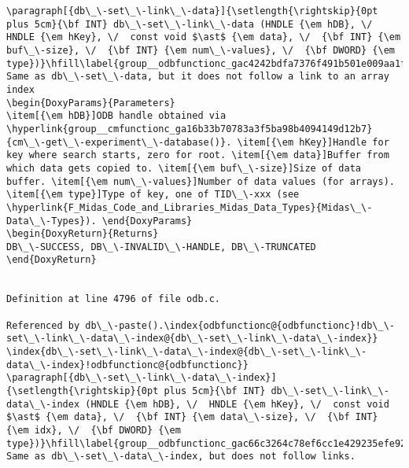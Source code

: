 \begin{DoxyItemize}
\begin{DoxyCode}
\begin{verbatim}
\paragraph[{db\_\-set\_\-link\_\-data}]{\setlength{\rightskip}{0pt plus 5cm}{\bf INT} db\_\-set\_\-link\_\-data (HNDLE {\em hDB}, \/  HNDLE {\em hKey}, \/  const void $\ast$ {\em data}, \/  {\bf INT} {\em buf\_\-size}, \/  {\bf INT} {\em num\_\-values}, \/  {\bf DWORD} {\em type})}\hfill\label{group__odbfunctionc_gac4242bdfa7376f491b501e009aa1f840}
Same as db\_\-set\_\-data, but it does not follow a link to an array index 
\begin{DoxyParams}{Parameters}
\item[{\em hDB}]ODB handle obtained via \hyperlink{group__cmfunctionc_ga16b33b70783a3f5ba98b4094149d12b7}{cm\_\-get\_\-experiment\_\-database()}. \item[{\em hKey}]Handle for key where search starts, zero for root. \item[{\em data}]Buffer from which data gets copied to. \item[{\em buf\_\-size}]Size of data buffer. \item[{\em num\_\-values}]Number of data values (for arrays). \item[{\em type}]Type of key, one of TID\_\-xxx (see \hyperlink{F_Midas_Code_and_Libraries_Midas_Data_Types}{Midas\_\-Data\_\-Types}). \end{DoxyParams}
\begin{DoxyReturn}{Returns}
DB\_\-SUCCESS, DB\_\-INVALID\_\-HANDLE, DB\_\-TRUNCATED 
\end{DoxyReturn}


Definition at line 4796 of file odb.c.

Referenced by db\_\-paste().\index{odbfunctionc@{odbfunctionc}!db\_\-set\_\-link\_\-data\_\-index@{db\_\-set\_\-link\_\-data\_\-index}}
\index{db\_\-set\_\-link\_\-data\_\-index@{db\_\-set\_\-link\_\-data\_\-index}!odbfunctionc@{odbfunctionc}}
\paragraph[{db\_\-set\_\-link\_\-data\_\-index}]{\setlength{\rightskip}{0pt plus 5cm}{\bf INT} db\_\-set\_\-link\_\-data\_\-index (HNDLE {\em hDB}, \/  HNDLE {\em hKey}, \/  const void $\ast$ {\em data}, \/  {\bf INT} {\em data\_\-size}, \/  {\bf INT} {\em idx}, \/  {\bf DWORD} {\em type})}\hfill\label{group__odbfunctionc_gac66c3264c78ef6cc1e429235efe92ed6}
Same as db\_\-set\_\-data\_\-index, but does not follow links.



\end{verbatim}
\end{DoxyCode}
\end{DoxyItemize}
